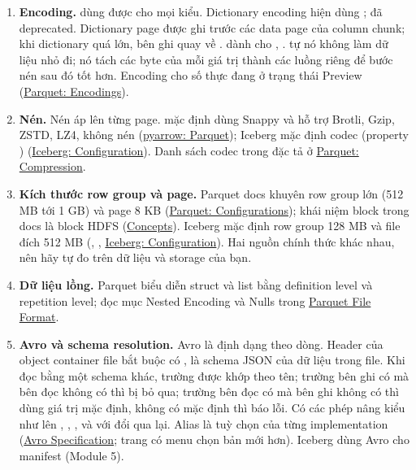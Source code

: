 \begin{enumerate}
  \item \textbf{Encoding.}  dùng được cho mọi kiểu. Dictionary encoding hiện dùng ;  đã deprecated. Dictionary page được ghi trước các data page của column chunk; khi dictionary quá lớn, bên ghi quay về .  dành cho , .  tự nó không làm dữ liệu nhỏ đi; nó tách các byte của mỗi giá trị thành các luồng riêng để bước nén sau đó tốt hơn. Encoding  cho số thực đang ở trạng thái Preview (\href{https://parquet.apache.org/docs/file-format/data-pages/encodings/}{Parquet: Encodings}).
  \item \textbf{Nén.} Nén áp lên từng page.  mặc định dùng Snappy và hỗ trợ Brotli, Gzip, ZSTD, LZ4, không nén (\href{https://arrow.apache.org/docs/python/parquet.html}{pyarrow: Parquet}); Iceberg mặc định codec  (property ) (\href{https://iceberg.apache.org/docs/latest/configuration/}{Iceberg: Configuration}). Danh sách codec trong đặc tả ở \href{https://parquet.apache.org/docs/file-format/data-pages/compression/}{Parquet: Compression}.
  \item \textbf{Kích thước row group và page.} Parquet docs khuyên row group lớn (512 MB tới 1 GB) và page 8 KB (\href{https://parquet.apache.org/docs/file-format/configurations/}{Parquet: Configurations}); khái niệm block trong docs là block HDFS (\href{https://parquet.apache.org/docs/concepts/}{Concepts}). Iceberg mặc định row group 128 MB và file đích 512 MB (, , \href{https://iceberg.apache.org/docs/latest/configuration/}{Iceberg: Configuration}). Hai nguồn chính thức khác nhau, nên hãy tự đo trên dữ liệu và storage của bạn.
  \item \textbf{Dữ liệu lồng.} Parquet biểu diễn struct và list bằng definition level và repetition level; đọc mục Nested Encoding và Nulls trong \href{https://parquet.apache.org/docs/file-format/}{Parquet File Format}.
  \item \textbf{Avro và schema resolution.} Avro là định dạng theo dòng. Header của object container file bắt buộc có , là schema JSON của dữ liệu trong file. Khi đọc bằng một schema khác, trường được khớp theo tên; trường bên ghi có mà bên đọc không có thì bị bỏ qua; trường bên đọc có mà bên ghi không có thì dùng giá trị mặc định, không có mặc định thì báo lỗi. Có các phép nâng kiểu như  lên , , , và  với  đổi qua lại. Alias là tuỳ chọn của từng implementation (\href{https://avro.apache.org/docs/1.11.1/specification/}{Avro Specification}; trang có menu chọn bản mới hơn). Iceberg dùng Avro cho manifest (Module 5).

\end{enumerate}
